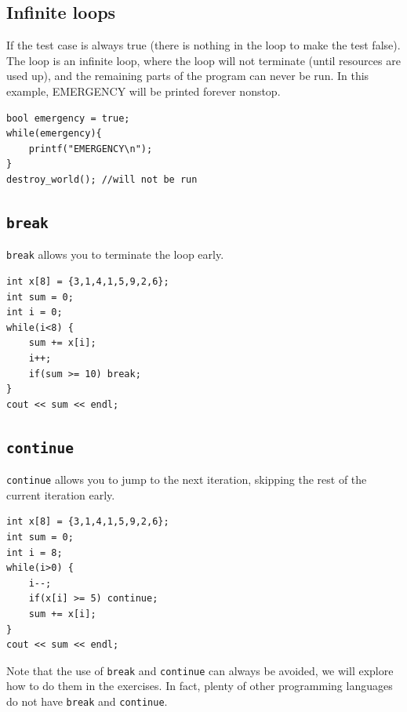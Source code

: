 \subsection{Infinite loops}

If the test case is always true (there is nothing in the loop to make the test false). The loop is an infinite loop, where the loop will not terminate (until resources are used up), and the remaining parts of the program can never be run. In this example, EMERGENCY will be printed forever nonstop.

\begin{lstlisting}
bool emergency = true;
while(emergency){
    printf("EMERGENCY\n");
}
destroy_world(); //will not be run
\end{lstlisting}

\subsection{\texttt{break}}
\label{sec:loopbreak}
\texttt{break} allows you to terminate the loop early.

\begin{lstlisting}
int x[8] = {3,1,4,1,5,9,2,6};
int sum = 0;
int i = 0;
while(i<8) { 
    sum += x[i];
    i++;
    if(sum >= 10) break;
}
cout << sum << endl;
\end{lstlisting}


\subsection{\texttt{continue}}
\label{sec:loopcontinue}
\texttt{continue} allows you to jump to the next iteration, skipping the rest of the current iteration early.

\begin{lstlisting}
int x[8] = {3,1,4,1,5,9,2,6};
int sum = 0;
int i = 8;
while(i>0) {
    i--;
    if(x[i] >= 5) continue;
    sum += x[i];
}
cout << sum << endl; 
\end{lstlisting}


Note that the use of \texttt{break} and \texttt{continue} can always be avoided, we will explore how to do them in the exercises. In fact, plenty of other programming languages do not have \texttt{break} and \texttt{continue}. 


